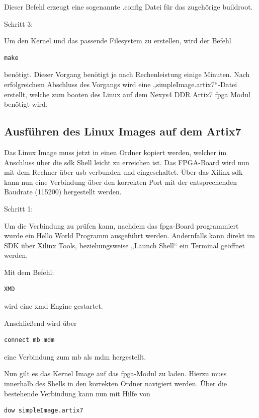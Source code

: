 Dieser Befehl erzeugt eine sogenannte .config Datei für das zugehörige buildroot.

Schritt 3:

Um den Kernel und das passende Filesystem zu erstellen, wird der Befehl

\begin{lstlisting}[caption={Erstellung des Kernels},label={code:mbkernel}]
  make
   \end{lstlisting}

benötigt. Dieser Vorgang benötigt je nach Rechenleistung einige Minuten.
Nach erfolgreichem Abschluss des Vorgangs wird eine „simpleImage.artix7“-Datei erstellt,
welche zum booten des Linux auf dem Nexys4 DDR Artix7 \ac{fpga} Modul benötigt wird.

\subsection{Ausführen des Linux Images auf dem Artix7}\label{kap:mcausführenlinux}


Das Linux Image muss jetzt in einen Ordner kopiert werden, welcher im Anschluss über
die \ac{sdk} Shell leicht zu erreichen ist. Das \ac{FPGA}-Board wird nun mit dem Rechner über \ac{usb} verbunden und eingeschaltet.
 Über das Xilinx \ac{sdk} kann nun eine Verbindung über den korrekten Port mit der entsprechenden Baudrate (115200)
 hergestellt werden.

Schritt 1:

Um die Verbindung zu prüfen kann, nachdem das \ac{fpga}-Board programmiert wurde ein Hello World Programm ausgeführt werden. Andernfalls kann direkt im SDK über Xilinx Tools, beziehungsweise  „Launch Shell“ ein Terminal geöffnet werden.

Mit dem Befehl:

\begin{lstlisting}[caption={Öffnen des \ac{xmd}},label={code:mbxmd}]
  XMD
   \end{lstlisting}


wird eine \ac{xmd} Engine gestartet.

Anschließend wird über
\begin{lstlisting}[caption={Herstellen der Verbindung zum \acl{mb}},label={code:mbtarget}]
connect mb mdm
   \end{lstlisting}

eine Verbindung zum \ac{mb} als \ac{mdm} hergestellt.

Nun gilt es das Kernel Image auf das \ac{fpga}-Modul zu laden.
Hierzu muss innerhalb des Shells in den korrekten Ordner navigiert werden.
Über die bestehende Verbindung kann nun mit Hilfe von
\begin{lstlisting}[caption={Download des Images},label={code:mbimage}]
  dow simpleImage.artix7
   \end{lstlisting}

